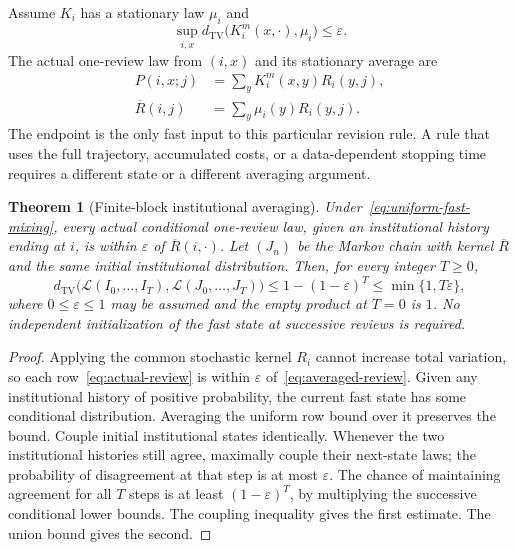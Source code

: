 \documentclass[11pt,letterpaper]{article}
\theoremstyle{plain}
\newtheorem{theorem}[proposition]{Theorem}
\theoremstyle{definition}
\theoremstyle{remark}
\newcommand{\TV}{d_{\mathrm{TV}}}
\newcommand{\Law}{\mathcal L}
\begin{document}
Assume $K_i$ has a stationary law $\mu_i$ and
\begin{equation}\label{eq:uniform-fast-mixing}
\sup_{i,x}\TV\bigl(K_i^m(x,\cdot),\mu_i\bigr)\leq\varepsilon.
\end{equation}
The actual one-review law from $(i,x)$ and its stationary average are
\begin{align}
P(i,x;j)&=\sum_y K_i^m(x,y)R_i(y,j),\label{eq:actual-review}\\
\overline R(i,j)&=\sum_y\mu_i(y)R_i(y,j).\label{eq:averaged-review}
\end{align}
The endpoint is the only fast input to this particular revision rule. A rule that uses the full trajectory, accumulated costs, or a data-dependent stopping time requires a different state or a different averaging argument.

\begin{theorem}[Finite-block institutional averaging]\label{thm:block-averaging}
Under~\eqref{eq:uniform-fast-mixing}, every actual conditional one-review law, given an institutional history ending at $i$, is within $\varepsilon$ of $\overline R(i,\cdot)$. Let $(J_n)$ be the Markov chain with kernel $\overline R$ and the same initial institutional distribution. Then, for every integer $T\geq0$,
\begin{equation}\label{eq:institutional-path-error}
\TV\bigl(\Law(I_0,\ldots,I_T),\Law(J_0,\ldots,J_T)\bigr)
\leq 1-(1-\varepsilon)^T\leq\min\{1,T\varepsilon\},
\end{equation}
where $0\leq\varepsilon\leq1$ may be assumed and the empty product at $T=0$ is $1$. No independent initialization of the fast state at successive reviews is required.
\end{theorem}
\begin{proof}
Applying the common stochastic kernel $R_i$ cannot increase total variation, so each row~\eqref{eq:actual-review} is within $\varepsilon$ of~\eqref{eq:averaged-review}. Given any institutional history of positive probability, the current fast state has some conditional distribution. Averaging the uniform row bound over it preserves the bound. Couple initial institutional states identically. Whenever the two institutional histories still agree, maximally couple their next-state laws; the probability of disagreement at that step is at most $\varepsilon$. The chance of maintaining agreement for all $T$ steps is at least $(1-\varepsilon)^T$, by multiplying the successive conditional lower bounds. The coupling inequality gives the first estimate. The union bound gives the second.
\end{proof}
\end{document}
